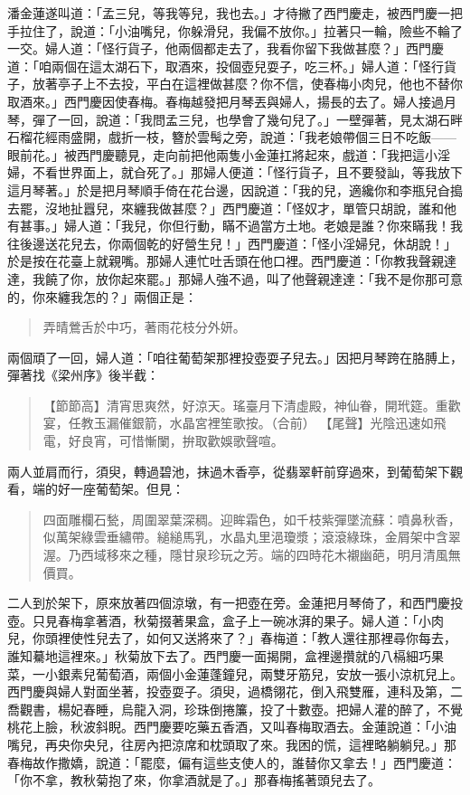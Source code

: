 潘金蓮遂叫道：「孟三兒，等我等兒，我也去。」才待撇了西門慶走，被西門慶一把手拉住了，說道：「小油嘴兒，你躲滑兒，我偏不放你。」拉著只一輪，險些不輪了一交。婦人道：「怪行貨子，他兩個都走去了，我看你留下我做甚麼？」西門慶道：「咱兩個在這太湖石下，取酒來，投個壺兒耍子，吃三杯。」婦人道：「怪行貨子，放著亭子上不去投，平白在這裡做甚麼？你不信，使春梅小肉兒，他也不替你取酒來。」西門慶因使春梅。春梅越發把月琴丟與婦人，揚長的去了。婦人接過月琴，彈了一回，說道：「我問孟三兒，也學會了幾句兒了。」一壁彈著，見太湖石畔石榴花經雨盛開，戲折一枝，簪於雲髩之旁，說道：「我老娘帶個三日不吃飯——眼前花。」被西門慶聽見，走向前把他兩隻小金蓮扛將起來，戲道：「我把這小淫婦，不看世界面上，就㒲死了。」那婦人便道：「怪行貨子，且不要發訕，等我放下這月琴著。」於是把月琴順手倚在花台邊，因說道：「我的兒，適纔你和李瓶兒㒲搗去罷，沒地扯囂兒，來纏我做甚麼？」西門慶道：「怪奴才，單管只胡說，誰和他有甚事。」婦人道：「我兒，你但行動，瞞不過當方土地。老娘是誰？你來瞞我！我往後邊送花兒去，你兩個乾的好營生兒！」西門慶道：「怪小淫婦兒，休胡說！」於是按在花臺上就親嘴。那婦人連忙吐舌頭在他口裡。西門慶道：「你教我聲親達達，我饒了你，放你起來罷。」那婦人強不過，叫了他聲親達達：「我不是你那可意的，你來纏我怎的？」兩個正是：
\begin{quote}
弄晴鶯舌於中巧，著雨花枝分外妍。
\end{quote}

兩個頑了一回，婦人道：「咱往葡萄架那裡投壺耍子兒去。」因把月琴跨在胳膊上，彈著找《梁州序》後半截：
\begin{quote}
【節節高】清宵思爽然，好涼天。瑤臺月下清虛殿，神仙眷，開玳筵。重歡宴，任教玉漏催銀箭，水晶宮裡笙歌按。（合前）
【尾聲】光陰迅速如飛電，好良宵，可惜慚闌，拚取歡娛歌聲喧。
\end{quote}

兩人並肩而行，須臾，轉過碧池，抹過木香亭，從翡翠軒前穿過來，到葡萄架下觀看，端的好一座葡萄架。但見：
\begin{quote}
四面雕欄石甃，周圍翠葉深稠。迎眸霜色，如千枝紫彈墜流蘇：噴鼻秋香，似萬架綠雲垂繡帶。縋縋馬乳，水晶丸里浥瓊漿；滾滾綠珠，金屑架中含翠渥。乃西域移來之種，隱甘泉珍玩之芳。端的四時花木襯幽葩，明月清風無價買。
\end{quote}

二人到於架下，原來放著四個涼墩，有一把壺在旁。金蓮把月琴倚了，和西門慶投壺。只見春梅拿著酒，秋菊掇著果盒，盒子上一碗冰湃的果子。婦人道：「小肉兒，你頭裡使性兒去了，如何又送將來了？」春梅道：「教人還往那裡尋你每去，誰知驀地這裡來。」秋菊放下去了。西門慶一面揭開，盒裡邊攢就的八槅細巧果菜，一小銀素兒葡萄酒，兩個小金蓮蓬鐘兒，兩雙牙筋兒，安放一張小涼杌兒上。西門慶與婦人對面坐著，投壺耍子。須臾，過橋翎花，倒入飛雙雁，連科及第，二喬觀書，楊妃春睡，烏龍入洞，珍珠倒捲簾，投了十數壺。把婦人灌的醉了，不覺桃花上臉，秋波斜睨。西門慶要吃藥五香酒，又叫春梅取酒去。金蓮說道：「小油嘴兒，再央你央兒，往房內把涼席和枕頭取了來。我困的慌，這裡略躺躺兒。」那春梅故作撒嬌，說道：「罷麼，偏有這些支使人的，誰替你又拿去！」西門慶道：「你不拿，教秋菊抱了來，你拿酒就是了。」那春梅搖著頭兒去了。

